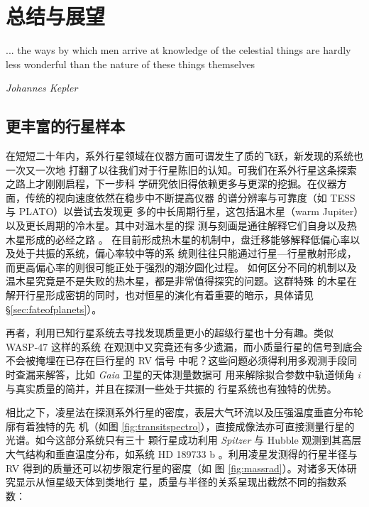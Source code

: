 \chapter{总结与展望} \label{chapter:conclusion}

\epigraph{... the ways by which men arrive at knowledge of the celestial things are hardly less wonderful than the nature of these things themselves}{\textit{Johannes Kepler}}


\section{更丰富的行星样本}

在短短二十年内，系外行星领域在仪器方面可谓发生了质的飞跃，新发现的系统也一次又一次地
打翻了以往我们对于行星陈旧的认知。可我们在系外行星这条探索之路上才刚刚启程，下一步科
学研究依旧得依赖更多与更深的挖掘。在仪器方面，传统的视向速度依然在稳步中不断提高仪器
的谱分辨率与可靠度（如 TESS\cite{Ricker2015} 与 PLATO\cite{Rauer2014}）以尝试去发现更
多的中长周期行星，这包括温木星（warm Jupiter）以及更长周期的冷木星。其中对温木星的探
测与刻画是通往解释它们自身以及热木星形成的必经之路
\cite{Petrovich2016,Huang2016,Dong2014a,Frewen2016,Dawson2014a,Antonini2016}。
在目前形成热木星的机制中，盘迁移能够解释低偏心率以及处于共振的系统，偏心率较中等的系
统则往往只能通过行星---行星散射形成，而更高偏心率的则很可能正处于强烈的潮汐圆化过程。
如何区分不同的机制以及温木星究竟是不是失败的热木星，都是非常值得探究的问题。这群特殊
的木星在解开行星形成密钥的同时，也对恒星的演化有着重要的暗示，具体请见 \S \ref{sec:fateofplanets}）。

再者，利用已知行星系统去寻找发现质量更小的超级行星也十分有趣。类似 WASP-47 这样的系统
在观测中又究竟还有多少遗漏，而小质量行星的信号到底会不会被掩埋在已存在巨行星的 RV 信号
中呢？这些问题必须得利用多观测手段同时查漏来解答，比如 \textit{Gaia} 卫星的天体测量数据可
用来解除拟合参数中轨道倾角 $i$ 与真实质量的简并\cite{Gaia2016}，并且在探测一些处于共振的
行星系统也有独特的优势\cite{Wu2016}。

相比之下，凌星法在探测系外行星的密度，表层大气环流以及压强温度垂直分布轮廓有着独特的先
机（如图 \ref{fig:transitspectro}），直接成像法亦可直接测量行星的光谱。如今这部分系统只有三十
颗行星成功利用 \textit{Spitzer} 与 Hubble 观测到其高层大气结构和垂直温度分布，如系统 HD 189733 b
\cite{Knutson2007}。利用凌星发测得的行星半径与 RV 得到的质量还可以初步限定行星的密度（如
图 \ref{fig:massrad}）。对诸多天体研究\cite{Baraffe2008,Fortney2007}显示从恒星级天体到类地行
星，质量与半径的关系呈现出截然不同的指数系数：

